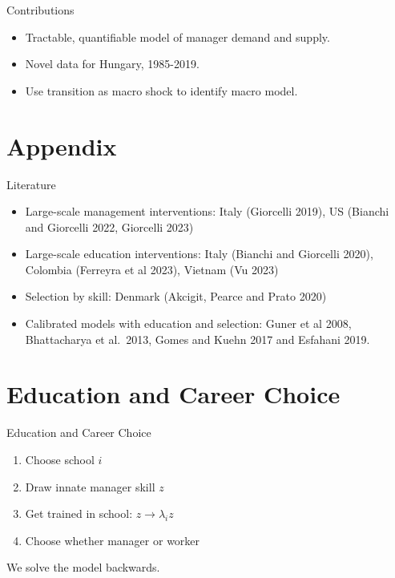 \documentclass[
  ignorenonframetext,
  aspectratio=1610,
]{beamer}
\providecommand{\tightlist}{%
  \setlength{\itemsep}{0pt}\setlength{\parskip}{0pt}}
\begin{document}
\begin{frame}{Contributions}
\protect\hypertarget{contributions}{}
\begin{itemize}
\tightlist
\item
  Tractable, quantifiable model of manager demand and supply.
\item
  Novel data for Hungary, 1985-2019.
\item
  Use transition as macro shock to identify macro model.
\end{itemize}
\end{frame}

\section{Appendix}\label{appendix}

\begin{frame}{Literature}
\protect\hypertarget{literature}{}
\begin{itemize}
\tightlist
\item
  Large-scale management interventions: Italy (Giorcelli 2019), US
  (Bianchi and Giorcelli 2022, Giorcelli 2023)
\item
  Large-scale education interventions: Italy (Bianchi and Giorcelli
  2020), Colombia (Ferreyra et al 2023), Vietnam (Vu 2023)
\item
  Selection by skill: Denmark (Akcigit, Pearce and Prato 2020)
\item
  Calibrated models with education and selection: Guner et al 2008,
  Bhattacharya et al.~2013, Gomes and Kuehn 2017 and Esfahani 2019.
\end{itemize}
\end{frame}

\section{Education and Career
Choice}\label{education-and-career-choice-1}

\begin{frame}{Education and Career Choice}
\protect\hypertarget{education-and-career-choice-2}{}
\begin{enumerate}
\tightlist
\item
  Choose school \(i\)
\item
  Draw innate manager skill \(z\)
\item
  Get trained in school: \(z\to\lambda_i z\)
\item
  Choose whether manager or worker
\end{enumerate}

We solve the model backwards.
\end{frame}
\end{document}
